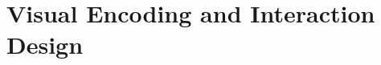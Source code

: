 \documentclass{vgtc}                          %
\begin{document}






















\section{Visual Encoding and Interaction Design} %
\end{document}

